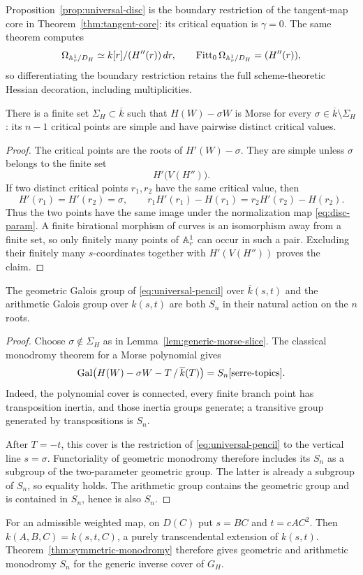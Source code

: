 Proposition~\ref{prop:universal-disc} is the boundary restriction of the
tangent-map core in Theorem~\ref{thm:tangent-core}: its critical equation is
$\gamma=0$.  The same theorem computes
\[
 \Omega_{\mathbb A^1_r/D_H}\simeq k[r]/(H''(r))\,dr,
 \qquad
 \operatorname{Fitt}_0\Omega_{\mathbb A^1_r/D_H}=(H''(r)),
\]
so differentiating the boundary restriction retains the full
scheme-theoretic Hessian decoration, including multiplicities.

\begin{lemma}\label{lem:generic-morse-slice}
There is a finite set $\Sigma_H\subset\overline{k}$ such that
$H(W)-\sigma W$ is Morse for every
$\sigma\in\overline{k}\setminus\Sigma_H$: its $n-1$ critical points are
simple and have pairwise distinct critical values.
\end{lemma}

\begin{proof}
The critical points are the roots of $H'(W)-\sigma$.  They are simple unless
$\sigma$ belongs to the finite set
\[
 H'\bigl(V(H'')\bigr).
\]
If two distinct critical points $r_1,r_2$ have the same critical value, then
\[
 H'(r_1)=H'(r_2)=\sigma,\qquad
 r_1H'(r_1)-H(r_1)=r_2H'(r_2)-H(r_2).
\]
Thus the two points have the same image under the normalization map
\eqref{eq:disc-param}.  A finite birational morphism of curves is an
isomorphism away from a finite set, so only finitely many points of
$\mathbb A^1_r$ can occur in such a pair.  Excluding their finitely many
$s$-coordinates together with $H'(V(H''))$ proves the claim.
\end{proof}

\begin{theorem}\label{thm:symmetric-monodromy}
The geometric Galois group of \eqref{eq:universal-pencil} over
$\overline{k}(s,t)$ and the arithmetic Galois group over $k(s,t)$ are both
$S_n$ in their natural action on the $n$ roots.
\end{theorem}

\begin{proof}
Choose $\sigma\notin\Sigma_H$ as in
Lemma~\ref{lem:generic-morse-slice}.  The classical monodromy theorem for a
Morse polynomial gives
\[
 \operatorname{Gal}\bigl(H(W)-\sigma W-T\,/\,\overline{k}(T)\bigr)=S_n
 \cite[Theorem~4.4.5]{serre-topics}.
\]
Indeed, the polynomial cover is connected, every finite branch point has
transposition inertia, and those inertia groups generate; a transitive group
generated by transpositions is $S_n$.

After $T=-t$, this cover is the restriction of
\eqref{eq:universal-pencil} to the vertical line $s=\sigma$.
Functoriality of geometric monodromy therefore includes its $S_n$ as a
subgroup of the two-parameter geometric group.  The latter is already a
subgroup of $S_n$, so equality holds.  The arithmetic group contains the
geometric group and is contained in $S_n$, hence is also $S_n$.
\end{proof}

For an admissible weighted map, on $D(C)$ put $s=BC$ and $t=cAC^2$.
Then $k(A,B,C)=k(s,t,C)$, a purely transcendental extension of $k(s,t)$.
Theorem~\ref{thm:symmetric-monodromy} therefore gives geometric and arithmetic
monodromy $S_n$ for the generic inverse cover of $G_H$.
